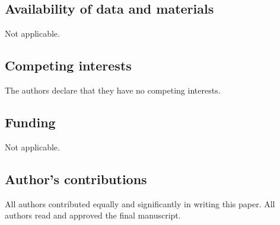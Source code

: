 \documentclass[11pt,reqno,a4paper]{amsart}
\theoremstyle{plain}
\theoremstyle{definition}
\theoremstyle{remark}
\numberwithin{equation}{section}
\begin{document}


\subsection*{Availability of data and materials}
Not applicable.

\subsection*{Competing interests}
The authors declare that they have no competing interests.

\subsection*{Funding}
Not applicable.

\subsection*{Author's contributions}
All authors contributed equally and significantly in writing this paper.
All authors read and approved the final manuscript.
\end{document}
